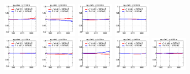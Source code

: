 \begin{figure}[!htbp]
{{\includegraphics[width=0.16\textwidth]{fig/spectra__pdf17_BB18_ADDGRW.png}
\includegraphics[width=0.16\textwidth]{fig/spectra__pdf18_BB18_ADDGRW.png}
\includegraphics[width=0.16\textwidth]{fig/spectra__pdf19_BB18_ADDGRW.png}
\includegraphics[width=0.16\textwidth]{fig/spectra__pdf20_BB18_ADDGRW.png}\\
\includegraphics[width=0.16\textwidth]{fig/spectra__pdf21_BB18_ADDGRW.png}
\includegraphics[width=0.16\textwidth]{fig/spectra__pdf22_BB18_ADDGRW.png}
\includegraphics[width=0.16\textwidth]{fig/spectra__pdf23_BB18_ADDGRW.png}
\includegraphics[width=0.16\textwidth]{fig/spectra__pdf24_BB18_ADDGRW.png}
\includegraphics[width=0.16\textwidth]{fig/spectra__pdf25_BB18_ADDGRW.png}\\


}}
\end{figure}
